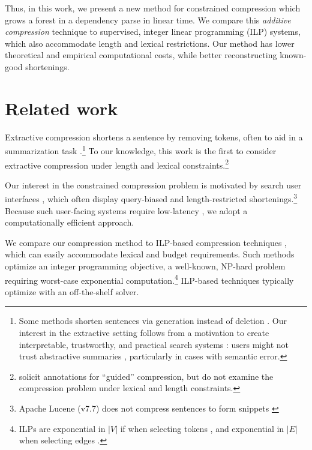 \documentclass[11pt,a4paper]{article}
\begin{document}
Thus, in this work, we present a new method for constrained compression which grows a forest in a dependency parse in linear time. We compare this \textit{additive compression} technique to supervised, integer linear programming (ILP) systems, which also accommodate length and lexical restrictions. Our method has lower theoretical and empirical computational costs, while better reconstructing known-good shortenings. 

\section{Related work}\label{s:relatedwork}

Extractive compression \cite{Knight2000StatisticsBasedS,clarke2008global,filippova2015sentence,Wang2017CanSH} shortens a sentence by removing tokens, often to aid in a summarization task \cite{Knight2000StatisticsBasedS,almeida2013fast,P16-1188}.\footnote{Some methods shorten sentences via generation instead of deletion \cite{rush2015neural,mallinson18}. Our interest in the extractive setting follows from a motivation to create interpretable,  trustworthy, and practical search systems \cite{Chuang2012InterpretationAT}: users might not trust abstractive summaries \cite{Zhang:2018:MSG:3290265.3274465}, particularly in cases with semantic error.} To our knowledge, this work is the first to consider extractive compression under length and lexical constraints.\footnote{\citet{Li2013DocumentSV} solicit annotations for ``guided'' compression, but do not examine the compression problem under lexical and length constraints.}

Our interest in the constrained compression problem is motivated by search user interfaces \cite{hearst2009search}, which often display query-biased \cite{tombros1998advantages} and length-restricted shortenings.\footnote{Apache Lucene {\small (v7.7)} does not compress sentences to form snippets \cite{lucene}} 
Because such user-facing systems require low-latency \cite{Nielsen,heerschei,Liu2014TheEO}, we adopt a computationally efficient approach. 

We compare our compression method to ILP-based compression techniques \cite{clarke2008global,filippova2008dependency,filippova2013overcoming,Wang2017CanSH}, which can easily accommodate lexical and budget requirements. Such methods optimize an integer programming objective, a well-known, NP-hard problem \cite{clarke2008global} requiring worst-case exponential computation.\footnote{ILPs are exponential in $|V|$ if when selecting tokens \cite{clarke2008global}, and exponential in $|E|$ when selecting edges \cite{filippova2013overcoming}.} ILP-based techniques typically optimize with an off-the-shelf solver. 
\end{document}
